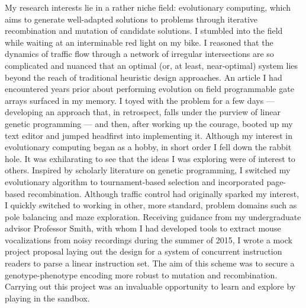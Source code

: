 
My research interests lie in a rather niche field: evolutionary computing, which aims to generate well-adapted solutions to problems through iterative recombination and mutation of candidate solutions.
I stumbled into the field while waiting at an interminable red light on my bike.
I reasoned that the dynamics of traffic flow through a network of irregular intersections are so complicated and nuanced that an optimal (or, at least, near-optimal) system lies beyond the reach of traditional heuristic design approaches.
An article I had encountered years prior about performing evolution on field programmable gate arrays surfaced in my memory.
I toyed with the problem for a few days --- developing an approach that, in retrospect, falls under the purview of linear genetic programming --- and then, after working up the courage, booted up my text editor and jumped headfirst into implementing it.
Although my interest in evolutionary computing began as a hobby, in short order I fell down the rabbit hole.
It was exhilarating to see that the ideas I was exploring were of interest to others.
Inspired by scholarly literature on genetic programming, I switched my evolutionary algorithm to tournament-based selection and incorporated page-based recombination.
Although traffic control had originally sparked my interest, I quickly switched to working in other, more standard, problem domains such as pole balancing and maze exploration.
Receiving guidance from my undergraduate advisor Professor Smith, with whom I had developed tools to extract mouse vocalizations from noisy recordings during the summer of 2015, I wrote a mock project proposal laying out the design for a system of concurrent instruction readers to parse a linear instruction set.
The aim of this scheme was to secure a genotype-phenotype encoding more robust to mutation and recombination.
Carrying out this project was an invaluable opportunity to learn and explore by playing in the sandbox.

